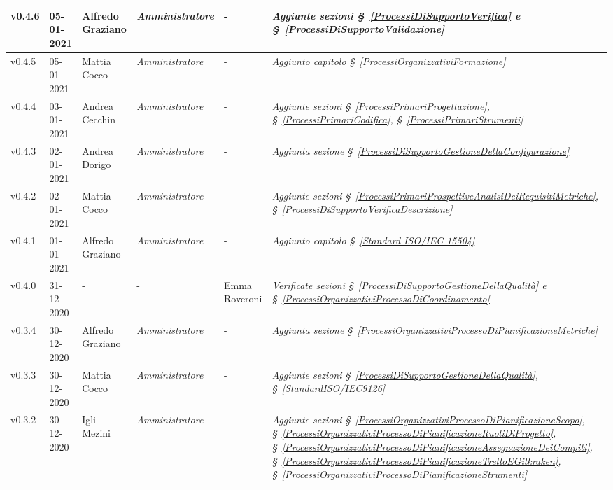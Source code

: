 {\begin{center}
\begin{longtable}[c]{|p{2cm-1\tabcolsep}|p{2cm}|p{3cm-2\tabcolsep}|p{3cm-1.5\tabcolsep}|p{}|p{4cm-2\tabcolsep}|}
		\hline
		\centering v0.4.6 & 05-01-2021 & Alfredo Graziano & \centering \textit{Amministratore} & \centering - & \textit{Aggiunte sezioni \S~\ref{ProcessiDiSupportoVerifica} e \S~\ref{ProcessiDiSupportoValidazione} } \\
		\hline
		\centering v0.4.5 & 05-01-2021 & Mattia Cocco & \centering \textit{Amministratore} & \centering - & \textit{Aggiunto capitolo \S~\ref{ProcessiOrganizzativiFormazione}} \\
		\hline
		\centering v0.4.4 & 03-01-2021 & Andrea Cecchin & \centering \textit{Amministratore} & \centering - & \textit{Aggiunte sezioni \S~\ref{ProcessiPrimariProgettazione}, \S~\ref{ProcessiPrimariCodifica}, \S~\ref{ProcessiPrimariStrumenti}} \\
		\hline
		\centering v0.4.3 & 02-01-2021 & Andrea Dorigo & \centering \textit{Amministratore} & \centering - & \textit{Aggiunta sezione \S~\ref{ProcessiDiSupportoGestioneDellaConfigurazione}} \\
		\hline
		\centering v0.4.2 & 02-01-2021 & Mattia Cocco & \centering \textit{Amministratore} & \centering - & \textit{Aggiunte sezioni \S~\ref{ProcessiPrimariProspettiveAnalisiDeiRequisitiMetriche}, \S~\ref{ProcessiDiSupportoVerificaDescrizione}} \\
		\hline
		\centering v0.4.1 & 01-01-2021 & Alfredo Graziano & \centering \textit{Amministratore} & \centering - & \textit{Aggiunto capitolo \S~\ref{Standard ISO/IEC 15504}} \\
		\hline
		\centering v0.4.0 & 31-12-2020 & \centering - & \centering - & Emma Roveroni & \textit{Verificate sezioni \S~\ref{ProcessiDiSupportoGestioneDellaQualità} e \S~\ref{ProcessiOrganizzativiProcessoDiCoordinamento} }  \\
		\hline
		\centering v0.3.4 & 30-12-2020 & Alfredo Graziano & \centering \textit{Amministratore} & \centering - & \textit{Aggiunta sezione \S~\ref{ProcessiOrganizzativiProcessoDiPianificazioneMetriche}} \\
		\hline
		\centering v0.3.3 & 30-12-2020 & Mattia Cocco & \centering \textit{Amministratore} & \centering - & \textit{Aggiunte sezioni \S~\ref{ProcessiDiSupportoGestioneDellaQualità}, \S~\ref{StandardISO/IEC9126} } \\
		\hline
		\centering v0.3.2 & 30-12-2020 & Igli Mezini & \centering \textit{Amministratore} & \centering - & \textit{Aggiunte sezioni \S~\ref{ProcessiOrganizzativiProcessoDiPianificazioneScopo}, \S~\ref{ProcessiOrganizzativiProcessoDiPianificazioneRuoliDiProgetto}, \S~\ref{ProcessiOrganizzativiProcessoDiPianificazioneAssegnazioneDeiCompiti}, \S~\ref{ProcessiOrganizzativiProcessoDiPianificazioneTrelloEGitkraken}, \S~\ref{ProcessiOrganizzativiProcessoDiPianificazioneStrumenti} } \\

\end{longtable}
\end{center}}
